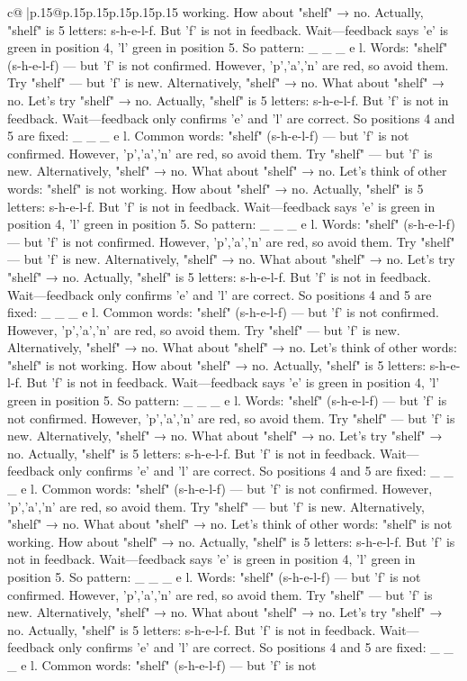 \documentclass{article}
\begin{document}
{\begin{supertabular}{c@{$\;$}|p{.15\linewidth}@{}p{.15\linewidth}p{.15\linewidth}p{.15\linewidth}p{.15\linewidth}p{.15\linewidth}}
{{{working. How about "shelf" → no. Actually, "shelf" is 5 letters: s{-}h{-}e{-}l{-}f. But 'f' is not in feedback. Wait—feedback says 'e' is green in position 4, 'l' green in position 5. So pattern: \_ \_ \_ e l. Words: "shelf" (s{-}h{-}e{-}l{-}f) — but 'f' is not confirmed. However, 'p','a','n' are red, so avoid them. Try "shelf" — but 'f' is new. Alternatively, "shelf" → no. What about "shelf" → no. Let's try "shelf" → no. Actually, "shelf" is 5 letters: s{-}h{-}e{-}l{-}f. But 'f' is not in feedback. Wait—feedback only confirms 'e' and 'l' are correct. So positions 4 and 5 are fixed: \_ \_ \_ e l. Common words: "shelf" (s{-}h{-}e{-}l{-}f) — but 'f' is not confirmed. However, 'p','a','n' are red, so avoid them. Try "shelf" — but 'f' is new. Alternatively, "shelf" → no. What about "shelf" → no. Let's think of other words: "shelf" is not working. How about "shelf" → no. Actually, "shelf" is 5 letters: s{-}h{-}e{-}l{-}f. But 'f' is not in feedback. Wait—feedback says 'e' is green in position 4, 'l' green in position 5. So pattern: \_ \_ \_ e l. Words: "shelf" (s{-}h{-}e{-}l{-}f) — but 'f' is not confirmed. However, 'p','a','n' are red, so avoid them. Try "shelf" — but 'f' is new. Alternatively, "shelf" → no. What about "shelf" → no. Let's try "shelf" → no. Actually, "shelf" is 5 letters: s{-}h{-}e{-}l{-}f. But 'f' is not in feedback. Wait—feedback only confirms 'e' and 'l' are correct. So positions 4 and 5 are fixed: \_ \_ \_ e l. Common words: "shelf" (s{-}h{-}e{-}l{-}f) — but 'f' is not confirmed. However, 'p','a','n' are red, so avoid them. Try "shelf" — but 'f' is new. Alternatively, "shelf" → no. What about "shelf" → no. Let's think of other words: "shelf" is not working. How about "shelf" → no. Actually, "shelf" is 5 letters: s{-}h{-}e{-}l{-}f. But 'f' is not in feedback. Wait—feedback says 'e' is green in position 4, 'l' green in position 5. So pattern: \_ \_ \_ e l. Words: "shelf" (s{-}h{-}e{-}l{-}f) — but 'f' is not confirmed. However, 'p','a','n' are red, so avoid them. Try "shelf" — but 'f' is new. Alternatively, "shelf" → no. What about "shelf" → no. Let's try "shelf" → no. Actually, "shelf" is 5 letters: s{-}h{-}e{-}l{-}f. But 'f' is not in feedback. Wait—feedback only confirms 'e' and 'l' are correct. So positions 4 and 5 are fixed: \_ \_ \_ e l. Common words: "shelf" (s{-}h{-}e{-}l{-}f) — but 'f' is not confirmed. However, 'p','a','n' are red, so avoid them. Try "shelf" — but 'f' is new. Alternatively, "shelf" → no. What about "shelf" → no. Let's think of other words: "shelf" is not working. How about "shelf" → no. Actually, "shelf" is 5 letters: s{-}h{-}e{-}l{-}f. But 'f' is not in feedback. Wait—feedback says 'e' is green in position 4, 'l' green in position 5. So pattern: \_ \_ \_ e l. Words: "shelf" (s{-}h{-}e{-}l{-}f) — but 'f' is not confirmed. However, 'p','a','n' are red, so avoid them. Try "shelf" — but 'f' is new. Alternatively, "shelf" → no. What about "shelf" → no. Let's try "shelf" → no. Actually, "shelf" is 5 letters: s{-}h{-}e{-}l{-}f. But 'f' is not in feedback. Wait—feedback only confirms 'e' and 'l' are correct. So positions 4 and 5 are fixed: \_ \_ \_ e l. Common words: "shelf" (s{-}h{-}e{-}l{-}f) — but 'f' is not }}}
\end{supertabular}}
\end{document}
